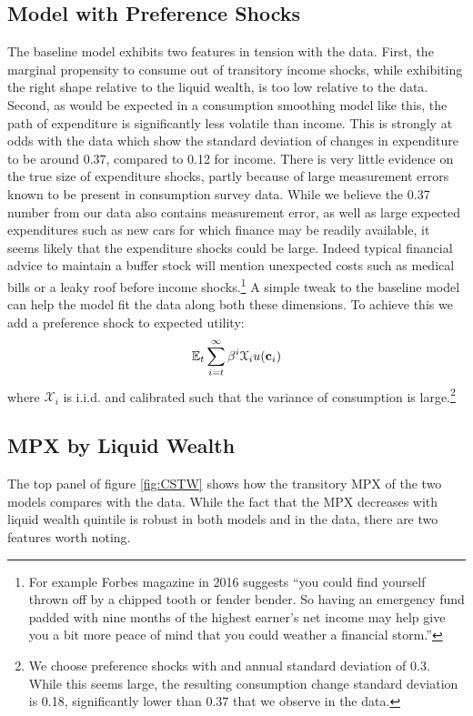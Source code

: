\documentclass[titlepage]{\econtex}\newcommand{\texname}{ConsumptionHeterogeneity}
\begin{document}
\subsection{Model with Preference Shocks}
The baseline model exhibits two features in tension with the data. First, the marginal propensity to consume out of transitory income shocks, while exhibiting the right shape relative to the liquid wealth, is too low relative to the data. Second, as would be expected in a consumption smoothing model like this, the path of expenditure is significantly less volatile than income. This is strongly at odds with the data which show the standard deviation of changes in expenditure to be around 0.37, compared to 0.12 for income. There is very little evidence on the true size of expenditure shocks, partly because of large measurement errors known to be present in consumption survey data. While we believe the 0.37 number from our data also contains measurement error, as well as large expected expenditures such as new cars for which finance may be readily available, it seems likely that the expenditure shocks could be large. Indeed typical financial advice to maintain a buffer stock will mention unexpected costs such as medical bills or a leaky roof before income shocks.\footnote{For example Forbes magazine in 2016 suggests ``you could find yourself thrown off by a chipped tooth or fender bender. So having an emergency fund padded with nine months of the highest earner's net income may help give you a bit more peace of mind that you could weather a financial storm.''} A simple tweak to the baseline model can help the model fit the data along both these dimensions. To achieve this we add a preference shock to expected utility:
\begin{align*}
\mathbb{E}_t \sum_{i=t}^{\infty} \beta^i \mathcal{X}_i u(\mathbf{c}_i)
\end{align*}
where $\mathcal{X}_i$ is i.i.d. and calibrated such that the variance of consumption is large.\footnote{We choose preference shocks with and annual standard deviation of 0.3. While this seems large, the resulting consumption change standard deviation is 0.18, significantly lower than 0.37 that we observe in the data.}

\subsection{MPX by Liquid Wealth}
The top panel of figure \ref{fig:CSTW} shows how the transitory MPX of the two models compares with the data. While the fact that the MPX decreases with liquid wealth quintile is robust in both models and in the data, there are two features worth noting. 
\end{document}
